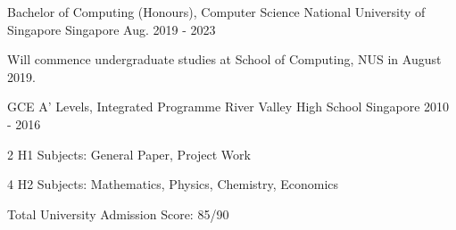 

\begin{cventries}

  \cventry
    {Bachelor of Computing (Honours), Computer Science} %
    {National University of Singapore} %
    {Singapore} %
    {Aug. 2019 - 2023} %
    {
      \begin{cvitems} %
        \item {Will commence undergraduate studies at School of Computing, NUS in August 2019.}
      \end{cvitems}
    }
    
  \cventry
    {GCE A' Levels, Integrated Programme} %
    {River Valley High School} %
    {Singapore} %
    {2010 - 2016} %
    {
      \begin{cvitems} %
        \item {2 H1 Subjects: General Paper, Project Work}
        \item {4 H2 Subjects: Mathematics, Physics, Chemistry, Economics}
        \item {Total University Admission Score: 85/90}
      \end{cvitems}
    }

\end{cventries}
